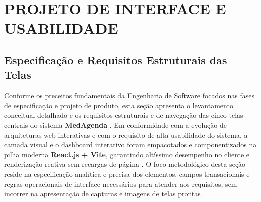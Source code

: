 \section{PROJETO DE INTERFACE E USABILIDADE}

\subsection{Especificação e Requisitos Estruturais das Telas}

Conforme os preceitos fundamentais da Engenharia de Software focados nas fases de especificação e projeto de produto, esta seção apresenta o levantamento conceitual detalhado e os requisitos estruturais e de navegação das cinco telas centrais do sistema \textbf{MedAgenda} \cite{shneiderman2016}. Em conformidade com a evolução de arquiteturas web interativas e com o requisito de alta usabilidade do sistema, a camada visual e o dashboard interativo foram empacotados e componentizados na pilha moderna \textbf{React.js + Vite}, garantindo altíssimo desempenho no cliente e renderização reativa sem recargas de página \cite{react2023}. O foco metodológico desta seção reside na especificação analítica e precisa dos elementos, campos transacionais e regras operacionais de interface necessários para atender aos requisitos, sem incorrer na apresentação de capturas e imagens de telas prontas \cite{nielsen1993, norman2013}.

